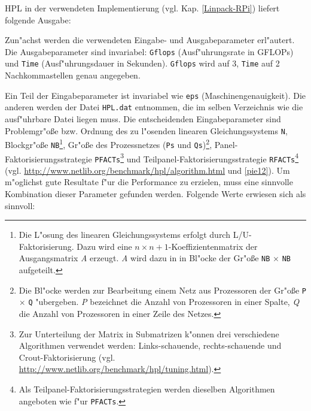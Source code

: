 HPL in der verwendeten Implementierung (vgl. Kap. \ref{Linpack-RPi}) liefert folgende Ausgabe:

Zun"achst werden die verwendeten Eingabe- und Ausgabeparameter erl"autert. Die Ausgabeparameter sind invariabel: \texttt{Gflops} (Ausf"uhrungsrate in GFLOPs) und \texttt{Time} (Ausf"uh\-rungsdauer in Sekunden). \texttt{Gflops} wird auf 3, \texttt{Time} auf 2 Nachkommastellen genau angegeben.

Ein Teil der Eingabeparameter ist invariabel wie \texttt{eps} (Maschinengenauigkeit). Die anderen werden der Datei \texttt{HPL.dat} entnommen, die im selben Verzeichnis wie die ausf"uhrbare Datei liegen muss. Die entscheidenden Eingabeparameter sind Problemgr"o\ss e bzw. Ordnung des zu l"osenden linearen Gleichungssystems \texttt{N}, Blockgr"o\ss e \texttt{NB}\footnote{Die L"osung des linearen Gleichungssystems erfolgt durch L/U-Faktorisierung. Dazu wird eine $n\times n+1$-Koeffizientenmatrix der Ausgangsmatrix \textit{A} erzeugt. \textit{A} wird dazu in in Bl"ocke der Gr"o\ss e \texttt{NB} $\times$ \texttt{NB} aufgeteilt.}, Gr"o\ss e des Prozessnetzes (\texttt{Ps} und \texttt{Qs})\footnote{Die Bl"ocke werden zur Bearbeitung einem Netz aus Prozessoren der Gr"o\ss e \texttt{P} $\times$ \texttt{Q} "ubergeben. \textit{P} bezeichnet die Anzahl von Prozessoren in einer Spalte, \textit{Q} die Anzahl von Prozessoren in einer Zeile des Netzes.}, Panel-Faktorisierungsstrategie \texttt{PFACTs}\footnote{Zur Unterteilung der Matrix in Submatrizen k"onnen drei verschiedene Algorithmen verwendet werden: Links-schauende, rechts-schauende und Crout-Faktorisierung (vgl. \url{http://www.netlib.org/benchmark/hpl/tuning.html}).} und Teilpanel-Faktorisierungsstrategie \texttt{RFACTs}\footnote{Als Teilpanel-Faktorisierungsstrategien werden dieselben Algorithmen angeboten wie f"ur \texttt{PFACTs}.} (vgl. \url{http://www.netlib.org/benchmark/hpl/algorithm.html} und \ref{pie12}). Um m"og\-lichst gute Resultate f"ur die Performance zu erzielen, muss eine sinnvolle Kombination dieser Parameter gefunden werden. Folgende Werte erwiesen sich als sinnvoll: 
